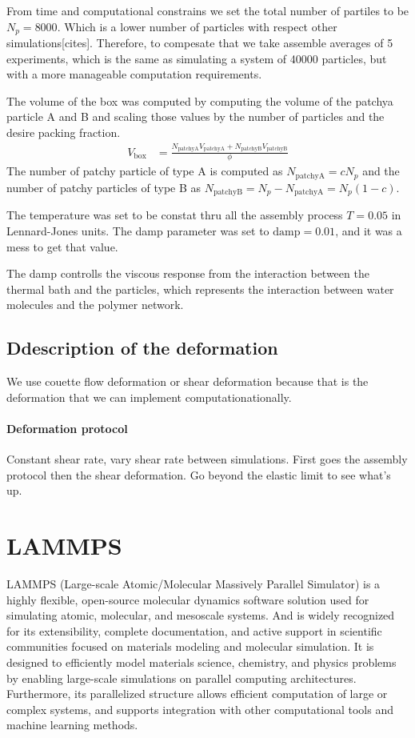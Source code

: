 From time and computational constrains we set the total number of partiles to be $N_p=\num{8000}$.
Which is a lower number of particles with respect other simulations[cites].
Therefore, to compesate that we take assemble averages of 5 experiments, which is the same as simulating a system of \num{40000} particles, but with a more manageable computation requirements.

The volume of the box was computed by computing the volume of the patchya particle A and B and scaling those values by the number of particles and the desire packing fraction.
\begin{align*}
    V_{\mathrm{box}} &= \frac{N_{\mathrm{patchyA}}V_{\mathrm{patchyA}}+N_{\mathrm{patchyB}}V_{\mathrm{patchyB}}}{\phi}
\end{align*}
The number of patchy particle of type A is computed as $N_{\mathrm{patchyA}} = c N_p$ and the number of patchy particles of type B as $N_{\mathrm{patchyB}}= N_p - N_{\mathrm{patchyA}}= N_p(1 - c )$.

The temperature was set to be constat thru all the assembly process $T=0.05$ in Lennard-Jones units.
The damp parameter was set to $\mathrm{damp}=0.01$, and it was a mess to get that value.

The damp controlls the viscous response from the interaction between the thermal bath and the particles, which represents the interaction between water molecules and the polymer network.

\subsection{Ddescription of the deformation}

We use couette flow deformation or shear deformation because that is the deformation that we can implement computationationally.

\paragraph{Deformation protocol} Constant shear rate, vary shear rate between simulations.
First goes the assembly protocol then the shear deformation.
Go beyond the elastic limit to see what's up.


\section{LAMMPS}

LAMMPS (Large-scale Atomic/Molecular Massively Parallel Simulator) is a highly flexible, open-source molecular dynamics software solution used for simulating atomic, molecular, and mesoscale systems. 
And is widely recognized for its extensibility, complete documentation, and active support in scientific communities focused on materials modeling and molecular simulation.
It is designed to efficiently model materials science, chemistry, and physics problems by enabling large-scale simulations on parallel computing architectures.
Furthermore, its parallelized structure allows efficient computation of large or complex systems, and supports integration with other computational tools and machine learning methods.

